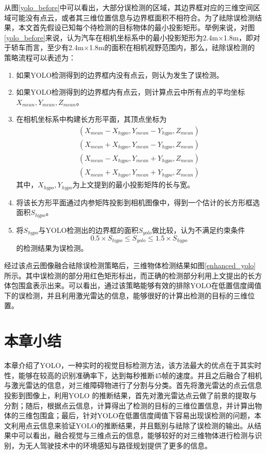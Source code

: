 从图\ref{yolo_before}中可以看出，大部分误检测的区域，其边界框对应的三维空间区域可能没有点云，或者其三维位置信息与边界框面积不相符合。为了祛除误检测结果，本文首先假设已知每个待检测的目标物体的最小投影矩形。举例来说，对图\ref{yolo_before}来说，认为汽车在相机坐标系中的最小投影矩形为2.4m$\times$1.8m，即对于轿车而言，至少有2.4m$\times$1.8m的面积在相机视野范围内，那么，祛除误检测的策略流程可以表述为：
\begin{enumerate}
    \item 如果YOLO检测得到的边界框内没有点云，则认为发生了误检测。
    \item 如果YOLO检测得到的边界框内有点云，则计算点云中所有点的平均坐标 $X_{mean}, Y_{mean}, Z_{mean}$。
    \item 在相机坐标系中构建长方形平面，其顶点坐标为
    \begin{equation}
        \begin{split}
    (X_{mean} - X_{hypo}, Y_{mean}-Y_{hypo}, Z_{mean}) \\
    (X_{mean} + X_{hypo}, Y_{mean}-Y_{hypo}, Z_{mean}) \\
    (X_{mean} - X_{hypo}, Y_{mean}+Y_{hypo}, Z_{mean}) \\
    (X_{mean} + X_{hypo}, Y_{mean}+Y_{hypo}, Z_{mean})
        \end{split}
    \end{equation}
    其中，$X_{hypo}, Y_{hypo}$为上文提到的最小投影矩阵的长与宽。
    \item 将该长方形平面通过内参矩阵投影到相机图像中，得到一个估计的长方形框选面积$S_{hypo}$。
    \item 将$S_{hypo}$与YOLO检测出的边界框的面积$S_{yolo}$做比较，认为不满足约束条件    
    \begin{equation}
        0.5 \times S_{hypo} \leq S_{yolo} \leq 1.5 \times S_{hypo} 
    \end{equation}
    的检测结果为误检测。
\end{enumerate}

经过该点云图像融合祛除误检测策略后，三维物体检测结果如图\ref{enhanced_yolo}所示。其中误检测的部分用红色矩形标出，而正确的检测部分利用上文提出的长方体包围盒表示出来。可以看出，通过该策略能够有效的排除YOLO在低置信度阈值下的误检测，并且利用激光雷达的信息，能够很好的计算出检测的目标的三维位置。

\section{本章小结}

本章介绍了YOLO，一种实时的视觉目标检测方法，该方法最大的优点在于其实时性，能够在较高的识别准确率下，达到每秒推断45帧的速度。并且之后融合了相机与激光雷达的信息，对三维障碍物进行了分割与分类。首先将激光雷达的点云信息投影到图像上，利用YOLO 的推断结果，首先对激光雷达点云做了前景的提取与分割；随后，根据点云信息，计算得出了检测的目标的三维位置信息，并计算出物体的三维包围盒；最后，针对YOLO在低置信度阈值下容易出现误检测的问题，本文利用点云信息来验证YOLO的推断结果，并且甄别与祛除了误检测的输出。从结果中可以看出，融合视觉与三维点云的信息，能够较好的对三维物体进行检测与识别，为无人驾驶技术中的环境感知与路径规划提供了更多的信息。

